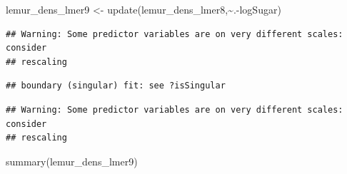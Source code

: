 \documentclass[
  12pt,
]{article}
\newenvironment{Shaded}{\begin{snugshade}}{\end{snugshade}}
\newcommand{\FunctionTok}[1]{\textcolor[rgb]{0.00,0.00,0.00}{#1}}
\newcommand{\NormalTok}[1]{#1}
\newcommand{\OtherTok}[1]{\textcolor[rgb]{0.56,0.35,0.01}{#1}}
\newcommand{\SpecialCharTok}[1]{\textcolor[rgb]{0.00,0.00,0.00}{#1}}
\begin{document}
\begin{Shaded}
\begin{Highlighting}[]
\NormalTok{lemur\_dens\_lmer9 }\OtherTok{\textless{}{-}} \FunctionTok{update}\NormalTok{(lemur\_dens\_lmer8,}\SpecialCharTok{\textasciitilde{}}\NormalTok{.}\SpecialCharTok{{-}}\NormalTok{logSugar)}
\end{Highlighting}
\end{Shaded}

\begin{verbatim}
## Warning: Some predictor variables are on very different scales: consider
## rescaling
\end{verbatim}

\begin{verbatim}
## boundary (singular) fit: see ?isSingular
\end{verbatim}

\begin{verbatim}
## Warning: Some predictor variables are on very different scales: consider
## rescaling
\end{verbatim}

\begin{Shaded}
\begin{Highlighting}[]
\FunctionTok{summary}\NormalTok{(lemur\_dens\_lmer9)}
\end{Highlighting}
\end{Shaded}
\end{document}
